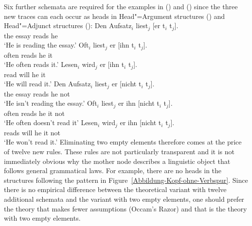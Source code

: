 Six further schemata are required for the examples in () and () since the three new traces can each occur
as heads in Head"=Argument structures () and Head"=Adjunct structures ():
\eal
\ex 
\gll Den Aufsatz$_i$ liest$_j$ [er t$_i$ t$_j$].\\
	 the essay reads \spacebr{}he\\
\glt `He is reading the essay.'
\ex 
\gll Oft$_i$ liest$_j$ er [ihn t$_i$ t$_j$].\\
	 often reads he \spacebr{}it\\
\glt `He often reads it.'
\ex 
\gll Lesen$_i$ wird$_j$ er [ihn t$_i$ t$_j$].\\
	 read will he \spacebr{}it\\
\glt `He will read it.'
\zl
\eal
\ex 
\gll Den Aufsatz$_i$ liest$_j$ er [nicht t$_i$ t$_j$].\\
	 the essay reads he \spacebr{}not\\
\glt `He isn't reading the essay.'
\ex 
\gll Oft$_i$ liest$_j$ er ihn [nicht t$_i$ t$_j$].\\
	 often reads he it \spacebr{}not\\
\glt `He often doesn't read it'
\ex 
\gll Lesen$_i$ wird$_j$ er ihn [nicht t$_i$ t$_j$].\\
	 reads will he it \spacebr{}not\\
\glt `He won't read it.'
\zl
\largerpage
Eliminating two empty elements therefore comes at the price of twelve new rules. These rules are not particularly transparent and it is not immediately
obvious why the mother node describes a linguistic object that follows general grammatical laws. For example, there are no heads in the structures following
the pattern in Figure~\ref{Abbildung-Kopf-ohne-Verbspur}. Since there is no empirical difference between the theoretical variant with twelve
additional schemata and the variant with two empty elements, one should prefer the theory that makes fewer assumptions (Occam's Razor) and that
is the theory with two empty elements.

